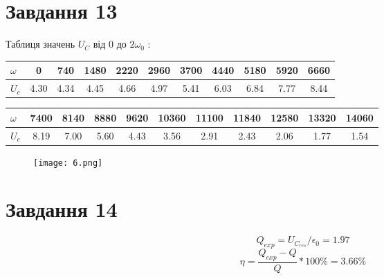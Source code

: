\documentclass[a4paper,12pt]{article}
\begin{document}
\section*{Завдання 13} 
\hspace*{\parindent}Таблиця значень \(U_C\) від 0 до \( 2\omega_0 \) : \newline
\vspace{0.1cm}
\newline
\begin{tabular}{| l | *{10}{ c |} }
  \hline
  \( \omega \) & 0 & 740 & 1480 & 2220 & 2960 & 3700 & 4440 & 5180 & 5920 & 6660\\
  \hline
  \( U_c \) & 4.30 & 4.34 & 4.45 & 4.66 & 4.97 & 5.41 & 6.03 & 6.84 & 7.77 & 8.44 \\
  \hline
\end{tabular}
\newline
\vspace{0.5cm}
\newline
\begin{tabular}{| l | *{10}{ c |} }
  \hline
  \( \omega \) & 7400 & 8140 & 8880 & 9620 & 10360 & 11100 & 11840 & 12580 & 13320 & 14060\\
  \hline
  \( U_c \) & 8.19 & 7.00 & 5.60 & 4.43 & 3.56 & 2.91 & 2.43 & 2.06 & 1.77 & 1.54 \\
\hline
\end{tabular}
\newline
\begin{figure}[!h]
\texttt{[image: 6.png]}
\end{figure}
\section*{Завдання 14}
\[ Q_{exp} = U_{C_{res}}/\epsilon_0 = 1.97 \]
\[ \eta = \dfrac{Q_{exp} - Q}{Q} * 100\% = 3.66\% \]
\end{document}
